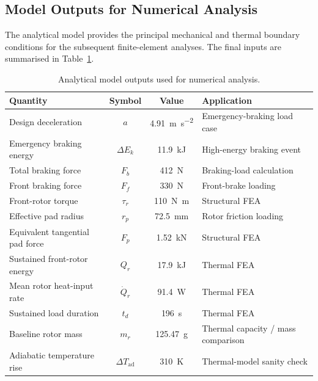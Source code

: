 \documentclass[11pt,a4paper]{article}
\begin{document}
\subsection{Model Outputs for Numerical Analysis}

The analytical model provides the principal mechanical and thermal boundary
conditions for the subsequent finite-element analyses. The final inputs are
summarised in Table~\ref{tab:model_outputs}.

\begin{table}[H]
    \centering
    \caption{Analytical model outputs used for numerical analysis.}
    \label{tab:model_outputs}
    \begin{tabularx}{\textwidth}{l c c X}
        \toprule
        Quantity & Symbol & Value & Application \\
        \midrule

        Design deceleration
        & $a$
        & \SI{4.91}{m.s^{-2}}
        & Emergency-braking load case \\

        Emergency braking energy
        & $\Delta E_k$
        & \SI{11.9}{kJ}
        & High-energy braking event \\

        Total braking force
        & $F_b$
        & \SI{412}{N}
        & Braking-load calculation \\

        Front braking force
        & $F_f$
        & \SI{330}{N}
        & Front-brake loading \\

        Front-rotor torque
        & $\tau_r$
        & \SI{110}{N.m}
        & Structural FEA \\

        Effective pad radius
        & $r_p$
        & \SI{72.5}{mm}
        & Rotor friction loading \\

        Equivalent tangential pad force
        & $F_p$
        & \SI{1.52}{kN}
        & Structural FEA \\

        Sustained front-rotor energy
        & $Q_r$
        & \SI{17.9}{kJ}
        & Thermal FEA \\

        Mean rotor heat-input rate
        & $\dot{Q}_r$
        & \SI{91.4}{W}
        & Thermal FEA \\

        Sustained load duration
        & $t_d$
        & \SI{196}{s}
        & Thermal FEA \\

        Baseline rotor mass
        & $m_r$
        & \SI{125.47}{g}
        & Thermal capacity / mass comparison \\

        Adiabatic temperature rise
        & $\Delta T_{\mathrm{ad}}$
        & \SI{310}{K}
        & Thermal-model sanity check \\

        \bottomrule
    \end{tabularx}
\end{table}
\end{document}
